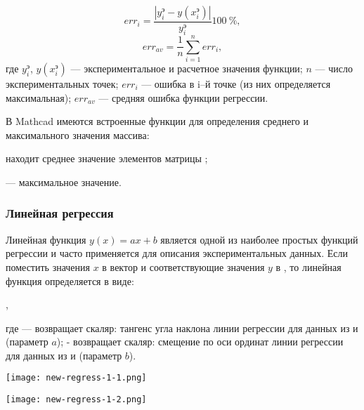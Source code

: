 \begin{equation}
err_i= \dfrac{\left| y_i^э - y(x^э_i) \right|}{y_i^э} 100\ \% ,
\end{equation}
\begin{equation}
err_{av}=\dfrac{1}{n}\sum\limits_{i=1}^{n} err_i ,
\end{equation}
где $y_i^э$, $y(x_i^э)$ --- экспериментальное и расчетное значения функции; $n$ --- число экспериментальных точек; $err_i$ --- ошибка в i–й точке (из них определяется максимальная); $err_{av}$ --- средняя ошибка функции регрессии.

В Mathcad имеются встроенные функции для определения среднего и максимального значения массива: 

 находит среднее значение элементов матрицы ;

  --- максимальное значение.

\subsubsection{Линейная регрессия}
Линейная функция $y(x)=ax + b $ является одной из наиболее простых функций регрессии и часто применяется для описания экспериментальных данных. 
Если поместить значения $x$ в вектор  и соответствующие значения $y$ в , то линейная функция определяется в виде:
\begin{center}
	,
\end{center}
где  --- возвращает скаляр: тангенс угла наклона линии регрессии для данных из  и  (параметр $a$);
 - возвращает скаляр: смещение по оси ординат линии регрессии для данных из  и  (параметр $b$).


\begin{center}
	\texttt{[image: new-regress-1-1.png]}
\end{center}
\begin{center}
	\texttt{[image: new-regress-1-2.png]}
\end{center}

